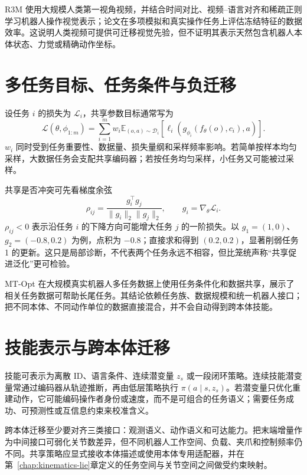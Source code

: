 R3M 使用大规模人类第一视角视频，并结合时间对比、视频--语言对齐和稀疏正则学习机器人操作视觉表示；论文在多项模拟和真实操作任务上评估冻结特征的数据效率\cite{nair2022r3m}。这说明人类视频可提供可迁移视觉先验，但不证明其表示天然包含机器人本体状态、力觉或精确动作坐标。

\section{多任务目标、任务条件与负迁移}

设任务 $i$ 的损失为 $\mathcal L_i$，共享参数目标通常写为
\begin{equation}
\mathcal L(\theta,\phi_{1:m})=\sum_{i=1}^{m}w_i
\mathbb E_{(o,a)\sim\mathcal D_i}
[\ell_i(g_{\phi_i}(f_\theta(o),c_i),a)].
\label{eq:multitask-loss}
\end{equation}
$w_i$ 同时受到任务重要性、数据量、损失量纲和采样频率影响。若简单按样本均匀采样，大数据任务会支配共享编码器；若按任务均匀采样，小任务又可能被过采样。

共享是否冲突可先看梯度余弦
\begin{equation}
\rho_{ij}=\frac{g_i^\top g_j}{\|g_i\|_2\|g_j\|_2},
\qquad g_i=\nabla_\theta\mathcal L_i.
\label{eq:gradient-cosine}
\end{equation}
$\rho_{ij}<0$ 表示沿任务 $i$ 的下降方向可能增大任务 $j$ 的一阶损失。以 $g_1=(1,0)$、$g_2=(-0.8,0.2)$ 为例，点积为 $-0.8$；直接求和得到 $(0.2,0.2)$，显著削弱任务 1 的更新。这只是局部诊断，不代表两个任务永远不相容，但比笼统声称“共享促进泛化”更可检验。

MT-Opt 在大规模真实机器人多任务数据上使用任务条件化和数据共享，展示了相关任务数据可帮助长尾任务\cite{kalashnikov2021mtopt}。其结论依赖任务族、数据规模和统一机器人接口；把不同本体、不同动作单位的数据直接混合，并不会自动得到跨本体技能。

\section{技能表示与跨本体迁移}

技能可表示为离散 ID、语言条件、连续潜变量 $z_s$ 或一段闭环策略。连续技能潜变量常通过编码器从轨迹推断，再由低层策略执行 $\pi(a\mid s,z_s)$。若潜变量只优化重建动作，它可能编码操作者身份或速度，而不是可组合的任务语义；需要任务成功、可预测性或互信息约束来校准含义。

跨本体迁移至少要对齐三类接口：观测语义、动作语义和可达能力。把末端增量作为中间接口可弱化关节数差异，但不同机器人工作空间、负载、夹爪和控制频率仍不同。共享策略应显式接收本体描述或使用本体专用适配器，并在第~\ref{chap:kinematics-lie}章定义的任务空间与关节空间之间做受约束映射。

